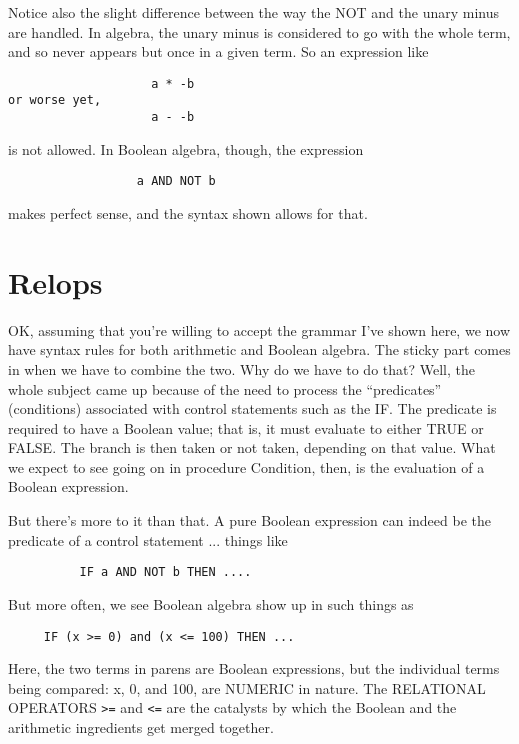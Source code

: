 Notice also the slight difference between the way the NOT and the unary  minus  are  handled. In  algebra, the unary  minus  is considered to go with the whole term, and so  never  appears  but once in a given term. So an expression like

\begin{verbatim}
                    a * -b
or worse yet,
                    a - -b
\end{verbatim}

is not allowed. In Boolean algebra, though, the expression

\begin{verbatim}
                  a AND NOT b
\end{verbatim}

makes perfect sense, and the syntax shown allows for that.

\section{Relops}

OK, assuming that you're willing to accept the grammar I've shown here, we  now  have syntax rules for both arithmetic and Boolean algebra. The  sticky part comes in when we have to combine the two. Why do we have to do that?  Well, the whole subject came up because of the  need  to  process  the  ``predicates'' (conditions) associated with control statements such as the IF. The predicate is required to have a Boolean value; that is, it must evaluate to either TRUE or FALSE. The branch is  then  taken  or  not taken, depending  on  that  value. What we expect to see  going  on  in procedure  Condition, then, is  the  evaluation  of  a  Boolean expression.

But there's more to it than that. A pure Boolean  expression can indeed be the predicate of a control statement ... things like

\begin{verbatim}
          IF a AND NOT b THEN ....
\end{verbatim}

But more often, we see Boolean algebra show up in such things as

\begin{verbatim}
     IF (x >= 0) and (x <= 100) THEN ...
\end{verbatim}

Here, the  two  terms in parens are Boolean expressions, but the individual terms being compared:  x, 0, and 100, are NUMERIC in nature. The RELATIONAL OPERATORS {\tt >=} and {\tt <=} are the  catalysts by which the  Boolean  and  the  arithmetic  ingredients  get merged together.

